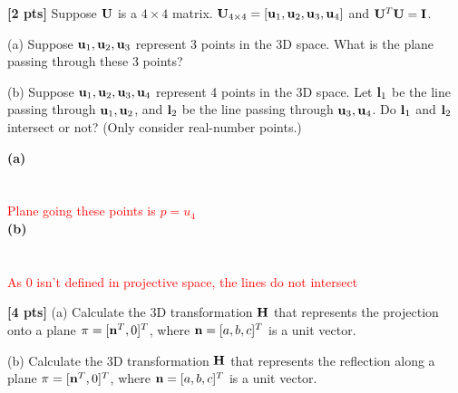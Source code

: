 \documentclass[11pt,addpoints,answers]{exam}
\numberwithin{equation}{section} %
\numberwithin{figure}{section} %
\numberwithin{table}{section} %
\begin{document}
\begin{questions}
\question \textbf{[2 pts]} Suppose $\mathbf{U}$ is a $4\times 4$ matrix. $\mathbf{U}_{4 \times 4} = [\mathbf{u}_1, \mathbf{u}_2, \mathbf{u}_3, \mathbf{u}_4]$ and $\mathbf{U}^T\mathbf{U} = \mathbf{I}$.

(a) Suppose $\mathbf{u}_1, \mathbf{u}_2, \mathbf{u}_3$ represent 3 points in the 3D space. What is the plane passing through these 3 points?

(b) Suppose $\mathbf{u}_1, \mathbf{u}_2, \mathbf{u}_3, \mathbf{u}_4$ represent 4 points in the 3D space. Let $\mathbf{l}_1$ be the line passing through $\mathbf{u}_1, \mathbf{u}_2$, and $\mathbf{l}_2$ be the line passing through $\mathbf{u}_3, \mathbf{u}_4$. Do $\mathbf{l}_1$ and $\mathbf{l}_2$ intersect or not? (Only consider real-number points.)

\begin{tcolorbox}[fit,height=5cm, width=\textwidth, blank, borderline={0.5pt}{-2pt},halign=left, valign=center, nobeforeafter]

\textbf{(a)}\\
\\
\\
\textcolor{red}{Plane going these points is $p = u_4$}\\
\vspace{0.2cm}
\textbf{(b)}\\
\\
\\
\textcolor{red}{As 0 isn't defined in projective space, the lines do not intersect}

\end{tcolorbox}

\question \textbf{[4 pts]} (a) Calculate the 3D transformation $\mathbf{H}$ that represents the projection onto a plane $\pi = [\mathbf{n}^T, 0]^T$, where $\mathbf{n} = [a,b,c]^T$ is a unit vector.

(b) Calculate the 3D transformation $\mathbf{H}$ that represents the reflection along a plane $\pi = [\mathbf{n}^T, 0]^T$, where $\mathbf{n} = [a,b,c]^T$ is a unit vector.


\end{questions}
\end{document}
